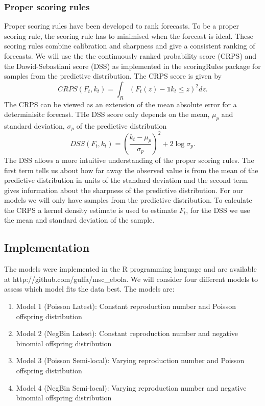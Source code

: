 \documentclass[12pt]{article}
\begin{document}
\subsubsection{Proper scoring rules}
Proper scoring rules have been developed to rank forecasts. To be a proper scoring rule, the scoring rule has to minimised when the forecast is ideal. These scoring rules combine calibration and sharpness and give a consistent ranking of forecasts. We will use the the continuously ranked probability score (CRPS) and the Dawid-Sebastiani score (DSS) as implemented in the scoringRules package \cite{jordanEvaluatingProbabilisticForecasts2018} for samples from the predictive distribution. The CRPS score is given by 
\[CRPS(F_t,k_t) = \int_R(F_t(z) - \mathds{1}{k_t \leq z})^2 dz.\] The CRPS can be viewed as an extension of the mean absolute error for a determinisitc forecast. THe DSS score only depends on the mean, $\mu_p$ and standard deviation, $\sigma_p$ of the predictive distribution
\[DSS(F_t, k_t) = \left(\frac{k_t- \mu_p}{\sigma_p}\right)^2 + 2\log\sigma_p.\]
The DSS allows a more intuitive understanding of the proper scoring rules. The first term tells us about how far away the observed value is from the mean of the predictive distribution in units of the standard deviation and the second term gives information about the sharpness of the predictive distribution. For our models we will only have samples from the predictive distribution. To calculate the CRPS a kernel density estimate is used to estimate $F_t$, for the DSS we use the mean and standard deviation of the sample. 

\subsection{Implementation}
The models were implemented in the R programming language \cite{rcoreteamLanguageEnvironmentStatistical2018} and are available at http://github.com/gulfa/msc\_ebola. We will consider four different models to assess which model fits the data best. The models are:

\begin{enumerate}
\item{Model 1 (Poisson Latest): Constant reproduction number and Poisson offspring distribution}
\item{Model 2 (NegBin Latest): Constant reproduction number and negative binomial offspring distribution}
\item{Model 3 (Poisson Semi-local): Varying reproduction number and Poisson offspring distribution}
\item{Model 4 (NegBin Semi-local): Varying reproduction number and negative binomial offspring distribution}
\end{enumerate}
\end{document}
